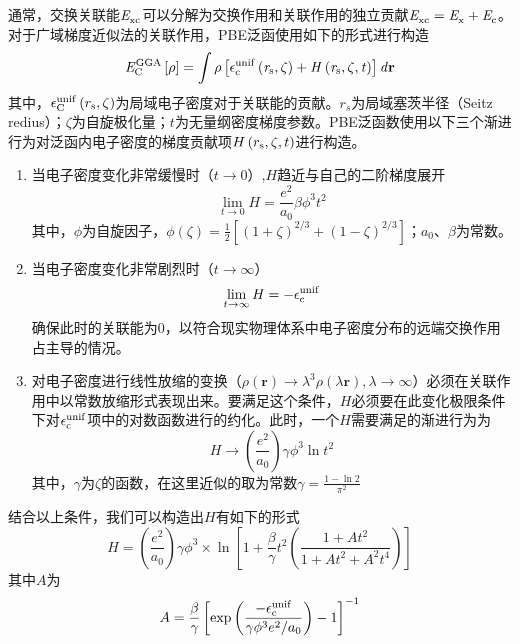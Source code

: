 通常，交换关联能$\it E_{\rm xc}^{\rm } \it$可以分解为交换作用和关联作用的独立贡献\chinesecolon $\it E_{\rm xc}^{\rm } \it=\it E_{\rm x}^{\rm } \it+\it E_{\rm c}^{\rm } \it$。对于广域梯度近似法的关联作用，PBE泛函使用如下的形式进行构造\chinesecolon
\begin{equation}
    \it E_{\rm C}^{\rm GGA} \it\left[\rho\right]=\int \rho\left[\epsilon_{\rm c}^{\rm unif}\left(r_{\rm s},\zeta\right)+H\left(r_{\rm s},\zeta,t\right)\right] d{\mathbf r}
\end{equation}
其中，$\epsilon_{\rm C}^{\rm unif}\left(r_{\rm s},\zeta\right)$为局域电子密度对于关联能的贡献。$r_s$为局域塞茨半径（Seitz redius）；$\zeta$为自旋极化量；$t$为无量纲密度梯度参数。PBE泛函数使用以下三个渐进行为对泛函内电子密度的梯度贡献项$H\left(r_{\rm s},\zeta,t\right)$进行构造。

\begin{enumerate}[label=（\arabic*）,wide]
    \item 当电子密度变化非常缓慢时（$t\rightarrow 0$）,$H$趋近与自己的二阶梯度展开\chinesecolon
    \[
        \lim_{t\rightarrow0}H=\frac{e^2}{a_{0}}\beta\phi^3t^2
        \]
    其中，$\phi$为自旋因子，$\phi\left(\zeta\right)=\frac{1}{2}\left[\left(1+\zeta\right)^{2/ 3}+\left(1-\zeta\right)^{2/ 3}\right]$；$a_{0}$、$\beta$为常数。
    \item 当电子密度变化非常剧烈时（$t\rightarrow \infty$）
    \[
        \lim_{t\rightarrow\infty}H=-\epsilon_{\rm c}^{\rm unif}
    \]
    确保此时的关联能为0，以符合现实物理体系中电子密度分布的远端交换作用占主导的情况。
    \item 对电子密度进行线性放缩的变换（$\rho\left({\bm r}\right)\rightarrow \lambda^3\rho(\lambda {\bm r}), \lambda\rightarrow \infty$）必须在关联作用中以常数放缩形式表现出来。要满足这个条件，$H$必须要在此变化极限条件下对$\epsilon_{\rm c}^{\rm unif}$项中的对数函数进行的约化。此时，一个$H$需要满足的渐进行为为
    \[
        H\rightarrow\left(\frac{e^2}{a_0}\right)\gamma\phi^3\ln t^2
    \]
    其中，$\gamma$为$\zeta$的函数，在这里近似的取为常数$\gamma=\frac{1-\ln2}{\pi^2}$
\end{enumerate}

    结合以上条件，我们可以构造出$H$有如下的形式\chinesecolon
    \begin{equation}
        H=\left(\frac{e^2}{a_0}\right)\gamma\phi^3\times \ln\left[1+\frac{\beta}{\gamma}t^2\left(\frac{1+At^2}{1+At^2+A^2t^4}\right)\right]
    \end{equation}
    其中$A$为\chinesecolon
    \[
        A=\frac{\beta}{\gamma}\left[\exp\left(\frac{-\epsilon_{\rm c}^{\rm unif}}{\gamma\phi^3e^2/ a_0}\right)-1\right]^{-1}
    \]

